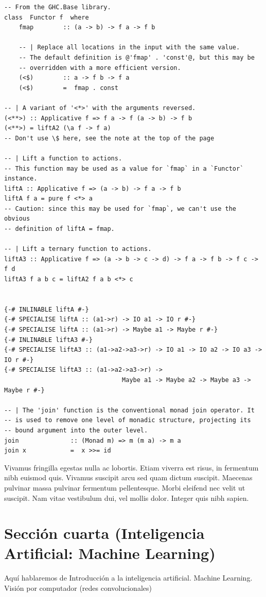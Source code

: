 \documentclass[oneside,openright,titlepage,numbers=noenddot,openany,headinclude,footinclude=true,
cleardoublepage=empty,abstractoff,BCOR=5mm,paper=a4,fontsize=12pt,main=spanish]{scrreprt}
\begin{document}
\begin{verbatim}
-- From the GHC.Base library.
class  Functor f  where
    fmap        :: (a -> b) -> f a -> f b

    -- | Replace all locations in the input with the same value.
    -- The default definition is @'fmap' . 'const'@, but this may be
    -- overridden with a more efficient version.
    (<$)        :: a -> f b -> f a
    (<$)        =  fmap . const

-- | A variant of '<*>' with the arguments reversed.
(<**>) :: Applicative f => f a -> f (a -> b) -> f b
(<**>) = liftA2 (\a f -> f a)
-- Don't use \$ here, see the note at the top of the page

-- | Lift a function to actions.
-- This function may be used as a value for `fmap` in a `Functor` instance.
liftA :: Applicative f => (a -> b) -> f a -> f b
liftA f a = pure f <*> a
-- Caution: since this may be used for `fmap`, we can't use the obvious
-- definition of liftA = fmap.

-- | Lift a ternary function to actions.
liftA3 :: Applicative f => (a -> b -> c -> d) -> f a -> f b -> f c -> f d
liftA3 f a b c = liftA2 f a b <*> c


{-# INLINABLE liftA #-}
{-# SPECIALISE liftA :: (a1->r) -> IO a1 -> IO r #-}
{-# SPECIALISE liftA :: (a1->r) -> Maybe a1 -> Maybe r #-}
{-# INLINABLE liftA3 #-}
{-# SPECIALISE liftA3 :: (a1->a2->a3->r) -> IO a1 -> IO a2 -> IO a3 -> IO r #-}
{-# SPECIALISE liftA3 :: (a1->a2->a3->r) ->
                                Maybe a1 -> Maybe a2 -> Maybe a3 -> Maybe r #-}

-- | The 'join' function is the conventional monad join operator. It
-- is used to remove one level of monadic structure, projecting its
-- bound argument into the outer level.
join              :: (Monad m) => m (m a) -> m a
join x            =  x >>= id
\end{verbatim}

Vivamus fringilla egestas nulla ac lobortis. Etiam viverra est risus,
in fermentum nibh euismod quis. Vivamus suscipit arcu sed quam dictum
suscipit. Maecenas pulvinar massa pulvinar fermentum
pellentesque. Morbi eleifend nec velit ut suscipit. Nam vitae
vestibulum dui, vel mollis dolor. Integer quis nibh sapien.


\chapter{Sección cuarta (Inteligencia Artificial: Machine Learning)}
{\Large Aquí hablaremos de Introducción a la inteligencia artificial. Machine
Learning. Visión por computador (redes convolucionales)}
\end{document}
